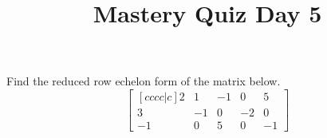 \documentclass{sbgLAquiz}
\title{Mastery Quiz Day 5 }
\begin{document}
\begin{problem}
Find the reduced row echelon form of the matrix below.
$$\begin{bmatrix}[cccc|c] 2 & 1 & -1 & 0 & 5 \\ 3 & -1 & 0 & -2 & 0 \\ -1 & 0 & 5 & 0 & -1 \end{bmatrix}$$
\end{problem}
\end{document}

